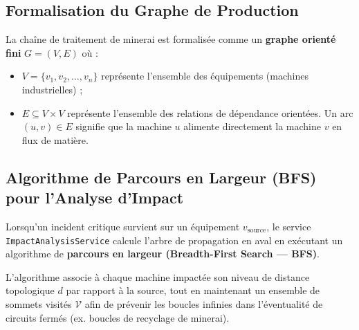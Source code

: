 \subsection{Formalisation du Graphe de Production}

La chaîne de traitement de minerai est formalisée comme un \textbf{graphe orienté fini} $G = (V, E)$ où :
\begin{itemize}
    \item $V = \{v_1, v_2, \dots, v_n\}$ représente l'ensemble des équipements (machines industrielles) ;
    \item $E \subseteq V \times V$ représente l'ensemble des relations de dépendance orientées. Un arc $(u, v) \in E$ signifie que la machine $u$ alimente directement la machine $v$ en flux de matière.
\end{itemize}

\subsection{Algorithme de Parcours en Largeur (BFS) pour l'Analyse d'Impact}

Lorsqu'un incident critique survient sur un équipement $v_{\text{source}}$, le service \texttt{ImpactAnalysisService} calcule l'arbre de propagation en aval en exécutant un algorithme de \textbf{parcours en largeur (Breadth-First Search --- BFS)}. 

L'algorithme associe à chaque machine impactée son niveau de distance topologique $d$ par rapport à la source, tout en maintenant un ensemble de sommets visités $\mathcal{V}$ afin de prévenir les boucles infinies dans l'éventualité de circuits fermés (ex. boucles de recyclage de minerai).

